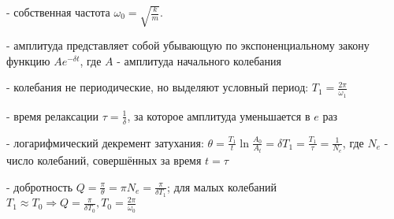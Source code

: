 \documentclass[12pt, letterpaper]{article}
\begin{document}
- собственная частота \(\omega_0=\sqrt{\frac{k}{m}}\).

- амплитуда представляет собой убывающую по экспоненциальному закону функцию \(Ae^{-\delta t}\), где \(A\) - амплитуда начального колебания

- колебания не периодические, но выделяют условный период: \(T_1=\frac{2\pi}{\omega_1}\)

- время релаксации \(\tau=\frac{1}{\delta}\), за которое амплитуда уменьшается в \(e\) раз

- логарифмический декремент затухания: \(\theta =\frac{T_1}{t}\ln \frac{A_0}{A_t}=\delta T_1=\frac{T_1}{\tau}=\frac{1}{N_e}\), где \(N_e\) - число колебаний, совершённых за время \(t=\tau\)

- добротность \(Q=\frac{\pi}{\theta}=\pi N_e=\frac{\pi}{\delta T_1}\); для малых колебаний \(T_1 \approx T_0 \Rightarrow Q=\frac{\pi}{\delta T_0}, T_0 = \frac{2\pi}{\omega_0}\)
\end{document}
